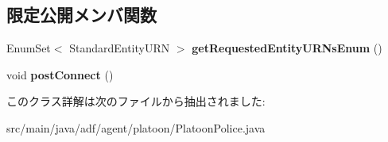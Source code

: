 \subsection*{限定公開メンバ関数}
\begin{DoxyCompactItemize}
\item 
\hypertarget{classadf_1_1agent_1_1platoon_1_1PlatoonPolice_ab878fbe79e592829fc6825e9a7ac74d2}{}\label{classadf_1_1agent_1_1platoon_1_1PlatoonPolice_ab878fbe79e592829fc6825e9a7ac74d2} 
Enum\+Set$<$ Standard\+Entity\+U\+RN $>$ {\bfseries get\+Requested\+Entity\+U\+R\+Ns\+Enum} ()
\item 
\hypertarget{classadf_1_1agent_1_1platoon_1_1PlatoonPolice_a466b75fef22d0931433d9c19da413b87}{}\label{classadf_1_1agent_1_1platoon_1_1PlatoonPolice_a466b75fef22d0931433d9c19da413b87} 
void {\bfseries post\+Connect} ()
\end{DoxyCompactItemize}


このクラス詳解は次のファイルから抽出されました\+:\begin{DoxyCompactItemize}
\item 
src/main/java/adf/agent/platoon/Platoon\+Police.\+java\end{DoxyCompactItemize}
